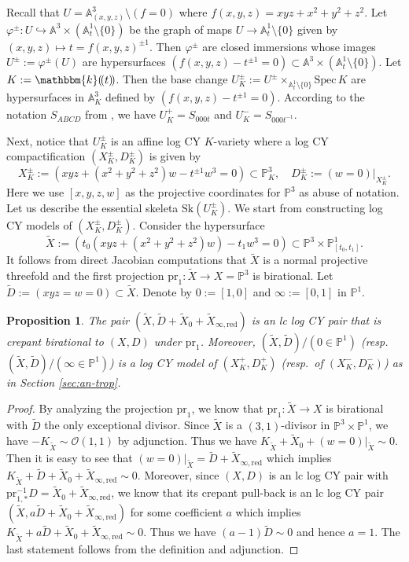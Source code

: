 \documentclass[reqno, 12pt]{amsart}
\newtheorem{prop}{Proposition}[section]
\theoremstyle{definition}
\newcommand{\bP}{\mathbb{P}}
\newcommand{\bA}{\mathbb{A}}
\newcommand{\bk}{\mathbbm{k}}
\newcommand{\tX}{\widetilde{X}}
\newcommand{\tD}{\widetilde{D}}
\newcommand{\cO}{\mathcal{O}}
\newcommand{\Spec}{\mathrm{Spec}}
\newcommand{\Sk}{\mathrm{Sk}}
\newcommand{\red}{\mathrm{red}}
\newcommand{\pr}{\mathrm{pr}}
\numberwithin{equation}{section}
\begin{document}
Recall that $U = \bA^3_{(x,y,z)}\setminus (f=0)$ where $f(x,y,z)=xyz+x^2 + y^2 + z^2$. Let $\varphi^{\pm}: U \hookrightarrow \bA^3 \times (\bA^1_t\setminus \{0\})$ be the graph of maps $U\to \bA^1_t \setminus \{0\}$ given by $(x,y,z) \mapsto t = f(x,y,z)^{\pm 1}$. Then $\varphi^{\pm}$ are closed immersions whose images $U^{\pm}:=\varphi^{\pm}(U)$ are  hypersurfaces $(f(x,y,z) - t^{\pm 1} = 0) \subset \bA^3 \times (\bA^1_{t}\setminus \{0\})$. Let $K:= \bk(\!(t)\!)$. Then the base change $U^{\pm}_K:= U^{\pm}\times_{\bA^1_t \setminus \{0\}} \Spec\, K$ are hypersurfaces in $\bA^3_K$ defined by $(f(x,y,z) - t^{\pm 1} =0)$. According to the notation $S_{ABCD}$ from \cite{Jan23}, we have $U_K^{+} = S_{000t}$ and $U_K^{-} = S_{000t^{-1}}$. 

Next, notice that $U_K^{\pm}$ is an affine log CY $K$-variety where a log CY compactification $(X_K^{\pm}, D_K^{\pm})$ is given by 
\[
X_K^{\pm}  := (xyz+(x^2+y^2+z^2) w - t^{\pm 1} w^3 = 0) \subset \bP^3_K, \quad D_K^{\pm} := (w=0)|_{X_K^{\pm}}.
\]
Here we use $[x,y,z,w]$ as the projective coordinates for $\bP^3$ as abuse of notation.
Let us describe the essential skeleta $\Sk(U_K^{\pm})$. We start from constructing log CY models of $(X_K^{\pm}, D_K^{\pm})$. Consider the hypersurface 
\[
\tX:= (t_0(xyz + (x^2+y^2+z^2)w) - t_1 w^3=0) \subset \bP^3\times \bP^1_{[t_0, t_1]}. 
\]
It follows from direct Jacobian computations that $\tX$ is a normal projective threefold and the first projection $\pr_1: \tX\to X=\bP^3$ is birational.
Let $\tD:= (xyz=w=0)\subset \tX$. Denote by $0:=[1,0]$ and $\infty:=[0,1]$ in $\bP^1$. 

\begin{prop}\label{prop:CY-model}
The pair $(\tX,\tD+\tX_0 +\tX_{\infty, \red})$ is an lc log CY pair that is crepant birational to $(X,D)$ under $\pr_1$. Moreover, $(\tX,\tD)/(0\in \bP^1)$ (resp.\ $(\tX,\tD)/(\infty\in \bP^1)$) is a log CY model of $(X_K^{+}, D_K^{+})$ (resp.\ of  $(X_K^{-}, D_K^{-})$) as in Section \ref{sec:an-trop}.
\end{prop}

\begin{proof}
By analyzing the projection $\pr_1$, we know that $\pr_1: \tX \to X$ is birational with $\tD$ the only exceptional divisor. Since $\tX$ is a $(3,1)$-divisor in $\bP^3\times \bP^1$, we have $-K_{\tX} \sim \cO(1,1)$ by adjunction. Thus we have $K_{\tX} + \tX_0 + (w=0)|_{\tX} \sim 0$. Then it is easy to see that $(w=0)|_{\tX}  = \tD + \tX_{\infty, \red}$ which  implies $K_{\tX} + \tD+ \tX_0 + \tX_{\infty, \red}  \sim 0$. Moreover, since $(X,D)$ is an lc log CY pair with $\pr_{1,*}^{-1}D = \tX_0 + \tX_{\infty, \red}$, we know that its crepant pull-back is an lc log CY pair $(\tX, a \tD + \tX_0 + \tX_{\infty, \red})$ for some coefficient $a$ which implies $K_{\tX} + a\tD+ \tX_0 + \tX_{\infty, \red}  \sim 0$. Thus we have $(a-1)\tD\sim 0$ and hence $a=1$. The last statement follows from the definition and adjunction.
\end{proof}
\end{document}
